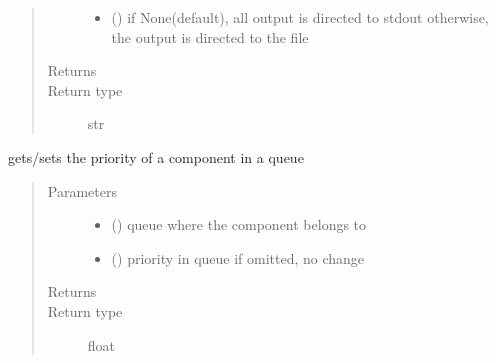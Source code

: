 \documentclass[letterpaper,10pt,english]{sphinxmanual}
\begin{document}
\begin{fulllineitems}
\begin{fulllineitems}
\begin{quote}
\begin{description}
\begin{itemize}
\item {} 
 () \textendash{} if None(default), all output is directed to stdout 
otherwise, the output is directed to the file

\end{itemize}

\item[{Returns}] \leavevmode
{}

\item[{Return type}] \leavevmode
str

\end{description}\end{quote}

\end{fulllineitems}


\begin{fulllineitems}
\label{\detokenize{Reference:salabim.Component.priority}}
gets/sets the priority of a component in a queue
\begin{quote}\begin{description}
\item[{Parameters}] \leavevmode\begin{itemize}
\item {} 
 ({\hyperref[\detokenize{Reference:salabim.Queue}]{}}) \textendash{} queue where the component belongs to

\item {} 
 () \textendash{} priority in queue 
if omitted, no change

\end{itemize}

\item[{Returns}] \leavevmode
{}

\item[{Return type}] \leavevmode
float

\end{description}\end{quote}


\end{fulllineitems}
\end{fulllineitems}
\end{document}
